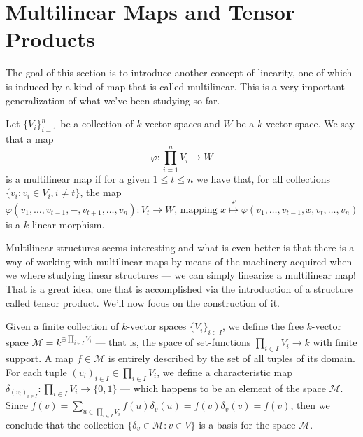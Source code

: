 
\section{Multilinear Maps and Tensor Products}

The goal of this section is to introduce another concept of linearity, one of
which is induced by a kind of map that is called multilinear. This is a very
important generalization of what we've been studying so far.

\begin{definition}\label{def: multilinear map}
    Let \(\{V_i\}_{i=1}^n\) be a collection of \(k\)-vector spaces and \(W\) be a
    \(k\)-vector space. We say that a map
    \[
        \varphi: \prod_{i=1}^n V_i \to W
    \]
    is a multilinear map if for a given \(1 \leq t \leq n\) we have that, for all
    collections \(\{v_i \colon v_i \in V_i, i \neq t\}\), the map
    \[
        \varphi(v_1, \dots, v_{t-1}, -, v_{t+1}, \dots, v_n):
        V_t \longrightarrow W
        \text{, mapping }
        x \overset{\varphi}\longmapsto \varphi(v_1, \dots, v_{t-1}, x, v_t, \dots, v_n)
    \]
    is a \(k\)-linear morphism.
\end{definition}

Multilinear structures seems interesting and what is even better is that there
is a way of working with multilinear maps by means of the machinery acquired
when we where studying linear structures --- we can simply linearize a multilinear
map! That is a great idea, one that is accomplished via the introduction of a
structure called tensor product. We'll now focus on the construction of it.

Given a finite collection of \(k\)-vector spaces \(\{V_i\}_{i \in I}\), we define
the free \(k\)-vector space \(\mathcal M = k^{\oplus \prod_{i \in I} V_i}\) --- that is, the
space of set-functions \(\prod_{i \in I} V_i \to k\) with finite support. A map \(f \in
\mathcal M\) is entirely described by the set of all tuples of its domain. For
each tuple \((v_i)_{i \in I} \in \prod_{i \in I} V_i\), we define a characteristic map
\(\delta_{(v_{i})_{i \in I}}: \prod_{i \in I} V_i \to \{0, 1\}\) --- which happens to be an
element of the space \(\mathcal M\). Since \(f(v) = \sum_{u \in \prod_{i \in I}V_i} f(u)
\delta_v(u) = f(v) \delta_v(v) = f(v)\), then we conclude that the collection \(\{\delta_{v} \in
\mathcal M \colon v \in V\}\) is a basis for the space \(\mathcal M\).


